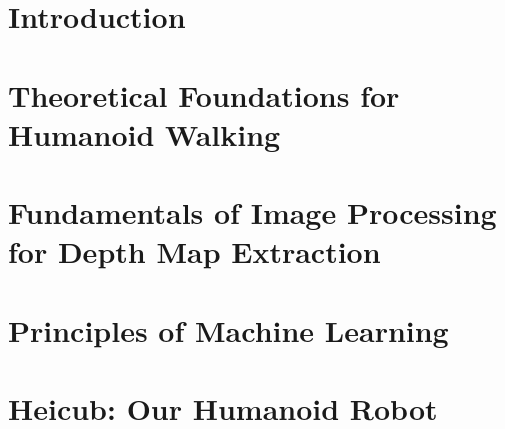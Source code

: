 \documentclass  [
paper    = a4,
BCOR     = 10mm,
twoside,
fontsize = 12pt,
toc      = bibnumbered,
toc      = listofnumbered,
numbers  = noendperiod,
headings = normal,
listof   = leveldown,
version  = 3.03
]                                       {scrreprt}
\newcommand\blankpage{
	\null
	\thispagestyle{empty}
	\addtocounter{page}{-1}
	\newpage
}
\begin{document}
	\afterpage{\blankpage}
	\afterpage{\blankpage}
	

	\afterpage{\blankpage}
	\tableofcontents
	
	\afterpage{\blankpage}
	\FloatBarrier
	\chapter{Introduction}
	
	
	\FloatBarrier
	\chapter{Theoretical Foundations for Humanoid Walking}

	\FloatBarrier
	\chapter{Fundamentals of Image Processing for Depth Map Extraction}
	
	\FloatBarrier
	\chapter{Principles of Machine Learning}

	\FloatBarrier
	\chapter{Heicub: Our Humanoid Robot}
	
\end{document}
